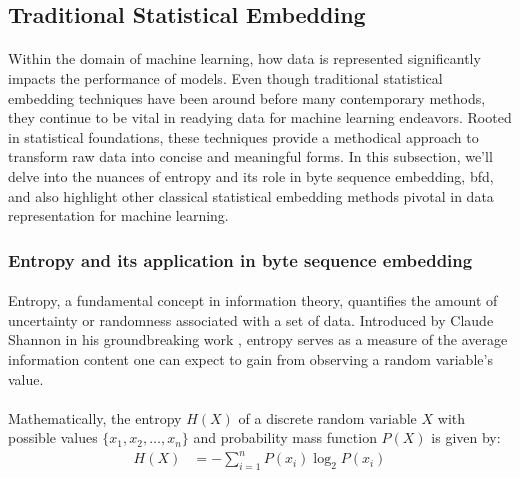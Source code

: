 \subsection{Traditional Statistical Embedding}\label{seq:background:traditional_statistical_embedding}

    \paragraph{}Within the domain of machine learning, how data is represented significantly impacts the performance of models. Even though traditional statistical embedding techniques have been around before many contemporary methods, they continue to be vital in readying data for machine learning endeavors. Rooted in statistical foundations, these techniques provide a methodical approach to transform raw data into concise and meaningful forms. In this subsection, we'll delve into the nuances of entropy and its role in byte sequence embedding, \acrfull{bfd}, and also highlight other classical statistical embedding methods pivotal in data representation for machine learning.
        
    \subsubsection{Entropy and its application in byte sequence embedding}
        \paragraph{}Entropy, a fundamental concept in information theory, quantifies the amount of uncertainty or randomness associated with a set of data. Introduced by Claude Shannon in his groundbreaking work \cite{shannon_mathematical_1948}, entropy serves as a measure of the average information content one can expect to gain from observing a random variable's value.

        \paragraph{}Mathematically, the entropy \(H(X)\) of a discrete random variable \(X\) with possible values \newline \(\{x_1, x_2, \ldots, x_n\}\) and probability mass function \(P(X)\) is given by:
        \begin{align}
            H(X) &= -\sum_{i=1}^{n} P(x_i) \log_2 P(x_i)
            \label{eq:shannon_entropy}
        \end{align}

